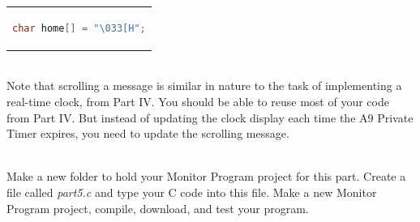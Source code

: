 \documentclass[epsfig,10pt,fullpage]{article}
\newcommand{\CommonDocsPath}{../../../../common/docs}
\begin{document}
\begin{center}
\begin{tabular}{c}
\begin{lstlisting}[language=C]
char home[] = "\033[H";
\end{lstlisting}
\end{tabular}
\end{center}

~\\
Note that scrolling a message is similar in nature to the 
task of implementing a real-time clock, from Part IV. You should be able to reuse most of 
your code from Part IV. But instead of updating the clock display each time the A9 Private Timer
expires, you need to update the scrolling message.  

~\\
\noindent
Make a new folder to hold your Monitor Program project for this part. Create a
file called {\it part5.c} and type your C code into this file.  Make a new Monitor Program 
project, compile, download, and test your program. 




\end{document}
